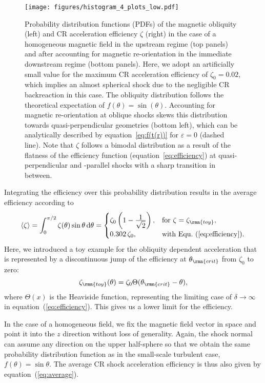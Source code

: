 \documentclass[8pt,a4paper,usenatbib]{mnras}
\newcommand{\de}{\mathrm{d}}
\renewcommand{\epsilon}{\varepsilon}
\begin{document}
\begin{figure*}
\centering
\texttt{[image: figures/histogram\_4\_plots\_low.pdf]} 
\caption{Probability distribution functions (PDFs) of the magnetic obliquity
  (left) and CR acceleration efficiency $\zeta$ (right) in the case of a
  homogeneous magnetic field in the upstream regime (top panels) and after
  accounting for magnetic re-orientation in the immediate downstream regime
  (bottom panels). Here, we adopt an artificially small value for the maximum CR
  acceleration efficiency of $\zeta_0 = 0.02$, which implies an almost spherical
  shock due to the negligible CR backreaction in this case.  The obliquity
  distribution follows the theoretical expectation of
  $f(\theta)=\sin(\theta)$. Accounting for magnetic re-orientation at oblique
  shocks skews this distribution towards quasi-perpendicular geometries (bottom
  left), which can be analytically described by equation~\eqref{eq:f(t(r))} for
  $\epsilon=0$ (dashed line). Note that $\zeta$ follows a bimodal distribution
  as a result of the flatness of the efficiency function
  (equation~\ref{eq:efficiency}) at quasi-perpendicular and -parallel shocks
  with a sharp transition in between.}
\label{fig8:histogram_l}
\end{figure*}

Integrating the efficiency over this probability
distribution results in the average efficiency according to
\begin{equation}
  \label{eq:average}
  \langle\zeta\rangle = \int_0^{\pi/2} \zeta (\theta) \sin \theta\, \de \theta =
  \begin{cases}
    \zeta_0\left(1-\frac{\displaystyle 1}{\displaystyle \sqrt{2}}\right),
      & \mbox{for }\zeta= \zeta_{\rmn{toy}},\\
    0.302 \,\zeta_0, & \mbox{with Equ.~(\ref{eq:efficiency}).}
  \end{cases}
\end{equation}
Here, we introduced a toy example for the obliquity dependent
acceleration that is represented by a discontinuous jump of the efficiency at
$\theta_{\rmn{crit}}$ from $\zeta_0$ to zero:
\begin{equation}
\zeta_{\rmn{toy}}(\theta)=\zeta_0\Theta(\theta_{\rmn{crit}}-\theta),
\end{equation}
where $\Theta(x)$ is the Heaviside function, representing the limiting case of
$\delta \rightarrow \infty$ in equation~(\ref{eq:efficiency}). This gives us a
lower limit for the efficiency.

In the case of a homogeneous field, we fix the magnetic field vector in space
and point it into the $z$ direction without loss of generality. Again, the shock
normal can assume any direction on the upper half-sphere so that we obtain the
same probability distribution function as in the small-scale turbulent case,
$f(\theta)=\sin\theta$. The average CR shock acceleration efficiency is thus
also given by equation~(\ref{eq:average}).
\end{document}
